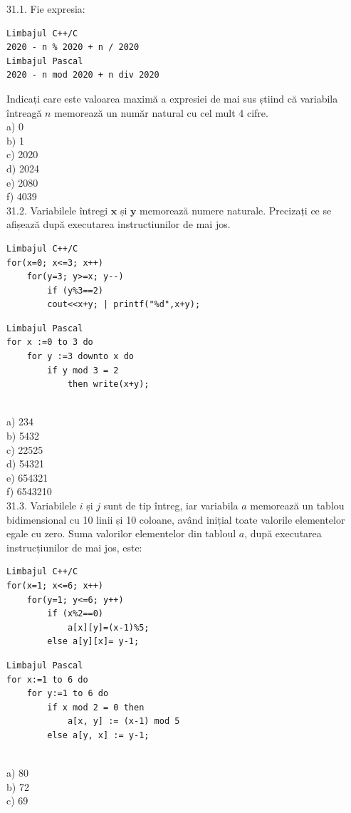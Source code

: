 \begin{itemize}
\begin{enumerate}
31.1. Fie expresia:
\begin{verbatim}
Limbajul C++/C
2020 - n % 2020 + n / 2020
Limbajul Pascal
2020 - n mod 2020 + n div 2020
\end{verbatim}
Indicați care este valoarea maximă a expresiei de mai sus știind că variabila întreagă $n$ memorează un număr natural cu cel mult 4 cifre.
\\
a) 0
\\
b) 1
\\
c) 2020
\\
d) 2024
\\
e) 2080
\\
f) 4039
\\
31.2. Variabilele întregi $\mathbf{x}$ și $\mathbf{y}$ memorează numere naturale. Precizați ce se afișează după executarea instructiunilor de mai jos.
\begin{verbatim}
Limbajul C++/C
for(x=0; x<=3; x++)
    for(y=3; y>=x; y--)
        if (y%3==2)
        cout<<x+y; | printf("%d",x+y);
\end{verbatim}
\begin{verbatim}
Limbajul Pascal
for x :=0 to 3 do
    for y :=3 downto x do
        if y mod 3 = 2
            then write(x+y);
\end{verbatim}
\\
a) 234
\\
b) 5432
\\
c) 22525
\\
d) 54321
\\
e) 654321
\\
f) 6543210
\\
31.3. Variabilele $i$ și $j$ sunt de tip întreg, iar variabila $a$ memorează un tablou bidimensional cu 10 linii și 10 coloane, având inițial toate valorile elementelor egale cu zero. Suma valorilor elementelor din tabloul $a$, după executarea instrucțiunilor de mai jos, este:
\begin{verbatim}
Limbajul C++/C
for(x=1; x<=6; x++)
    for(y=1; y<=6; y++)
        if (x%2==0)
            a[x][y]=(x-1)%5;
        else a[y][x]= y-1;
\end{verbatim}
\begin{verbatim}
Limbajul Pascal
for x:=1 to 6 do
    for y:=1 to 6 do
        if x mod 2 = 0 then
            a[x, y] := (x-1) mod 5
        else a[y, x] := y-1;
\end{verbatim}
\\
a) 80
\\
b) 72
\\
c) 69
\\

\end{enumerate}
\end{itemize}
